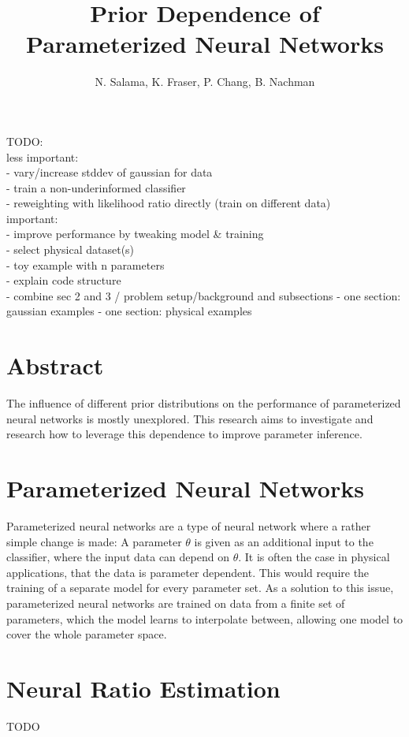 \documentclass{article}
\title{Prior Dependence of Parameterized Neural Networks}
\author{N. Salama, K. Fraser, P. Chang, B. Nachman}
\date{}
\begin{document}
\maketitle\textit{}

TODO:\\
less important:\\
- vary/increase stddev of gaussian for data \\
- train a non-underinformed classifier\\
- reweighting with likelihood ratio directly (train on different data)\\
important: \\
- improve performance by tweaking model \& training \\
- select physical dataset(s) \\
- toy example with n parameters \\
- explain code structure \\

- combine sec 2 and 3 / problem setup/background and subsections
- one section: gaussian examples
- one section: physical examples

\section{Abstract}
The influence of different prior distributions on the performance of parameterized neural networks is mostly unexplored. This research aims to investigate and research how to leverage this dependence to improve parameter inference.

\section{Parameterized Neural Networks}
Parameterized neural networks are a type of neural network where a rather simple change is made:
A parameter $\theta$ is given as an additional input to the classifier, where the input data can depend on $\theta$.
It is often the case in physical applications, that the data is parameter dependent. This would require the training of a separate
model for every parameter set. As a solution to this issue, parameterized neural networks are trained on data from a finite set of
parameters, which the model learns to interpolate between, allowing one model to cover the whole parameter space.

\section{Neural Ratio Estimation}
TODO
\end{document}
